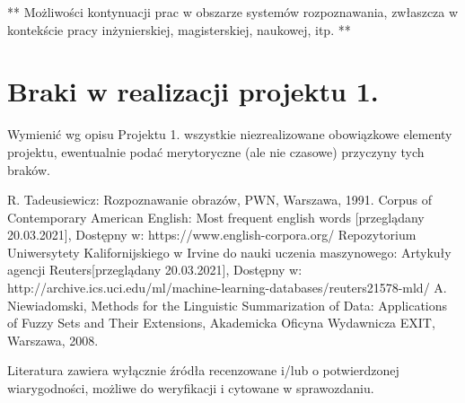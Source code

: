 \documentclass{classrep}
\begin{document}
** Możliwości kontynuacji prac w obszarze systemów rozpoznawania, zwłaszcza w kontekście pracy inżynierskiej,
magisterskiej, naukowej, itp. **\\



\section{Braki w realizacji projektu 1.}
Wymienić wg opisu Projektu 1. wszystkie niezrealizowane obowiązkowe elementy projektu, ewentualnie
podać merytoryczne (ale nie czasowe) przyczyny tych braków. 


\begin{thebibliography}{0}
 R. Tadeusiewicz: Rozpoznawanie obrazów, PWN, Warszawa, 1991.  
 Corpus of Contemporary American English: Most frequent english words [przeglądany  20.03.2021], Dostępny w: https://www.english-corpora.org/
 Repozytorium Uniwersytety Kalifornijskiego w Irvine do nauki uczenia maszynowego: Artykuły agencji Reuters[przeglądany 20.03.2021], 
Dostępny w: http://archive.ics.uci.edu/ml/machine-learning-databases/reuters21578-mld/
 A. Niewiadomski, Methods for the Linguistic Summarization of Data: Applications of Fuzzy Sets and Their Extensions, Akademicka Oficyna Wydawnicza EXIT, Warszawa, 2008.
\end{thebibliography}

Literatura zawiera wyłącznie źródła recenzowane i/lub o potwierdzonej wiarygodności,
możliwe do weryfikacji i cytowane w sprawozdaniu. 
\end{document}

